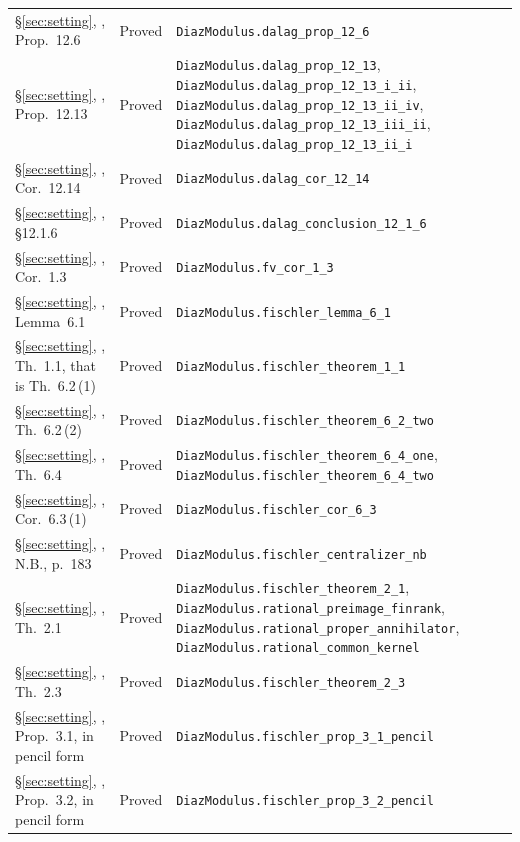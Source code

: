 \documentclass[11pt,a4paper]{article}
\theoremstyle{plain}
\theoremstyle{definition}
\begin{document}
\begin{center}
\begin{longtable}{@{}llp{6.2cm}@{}}
\S\ref{sec:setting}, \cite{waldschmidt-book}, Prop.~12.6 & Proved & \nolinkurl{DiazModulus.dalag_prop_12_6} \\
\S\ref{sec:setting}, \cite{waldschmidt-book}, Prop.~12.13 & Proved & \nolinkurl{DiazModulus.dalag_prop_12_13}, \nolinkurl{DiazModulus.dalag_prop_12_13_i_ii}, \nolinkurl{DiazModulus.dalag_prop_12_13_ii_iv}, \nolinkurl{DiazModulus.dalag_prop_12_13_iii_ii}, \nolinkurl{DiazModulus.dalag_prop_12_13_ii_i} \\
\S\ref{sec:setting}, \cite{waldschmidt-book}, Cor.~12.14 & Proved & \nolinkurl{DiazModulus.dalag_cor_12_14} \\
\S\ref{sec:setting}, \cite{waldschmidt-book}, \S12.1.6 & Proved & \nolinkurl{DiazModulus.dalag_conclusion_12_1_6} \\
\S\ref{sec:setting}, \cite{waldschmidt-2005b}, Cor.~1.3 & Proved & \nolinkurl{DiazModulus.fv_cor_1_3} \\
\S\ref{sec:setting}, \cite{fischler-2001}, Lemma~6.1 & Proved & \nolinkurl{DiazModulus.fischler_lemma_6_1} \\
\S\ref{sec:setting}, \cite{fischler-2001}, Th.~1.1, that is Th.~6.2\,(1) & Proved & \nolinkurl{DiazModulus.fischler_theorem_1_1} \\
\S\ref{sec:setting}, \cite{fischler-2001}, Th.~6.2\,(2) & Proved & \nolinkurl{DiazModulus.fischler_theorem_6_2_two} \\
\S\ref{sec:setting}, \cite{fischler-2001}, Th.~6.4 & Proved & \nolinkurl{DiazModulus.fischler_theorem_6_4_one}, \nolinkurl{DiazModulus.fischler_theorem_6_4_two} \\
\S\ref{sec:setting}, \cite{fischler-2001}, Cor.~6.3\,(1) & Proved & \nolinkurl{DiazModulus.fischler_cor_6_3} \\
\S\ref{sec:setting}, \cite{fischler-2001}, N.B., p.~183 & Proved & \nolinkurl{DiazModulus.fischler_centralizer_nb} \\
\S\ref{sec:setting}, \cite{fischler-2001}, Th.~2.1 & Proved & \nolinkurl{DiazModulus.fischler_theorem_2_1}, \nolinkurl{DiazModulus.rational_preimage_finrank}, \nolinkurl{DiazModulus.rational_proper_annihilator}, \nolinkurl{DiazModulus.rational_common_kernel} \\
\S\ref{sec:setting}, \cite{fischler-2001}, Th.~2.3 & Proved & \nolinkurl{DiazModulus.fischler_theorem_2_3} \\
\S\ref{sec:setting}, \cite{fischler-2001}, Prop.~3.1, in pencil form & Proved & \nolinkurl{DiazModulus.fischler_prop_3_1_pencil} \\
\S\ref{sec:setting}, \cite{fischler-2001}, Prop.~3.2, in pencil form & Proved & \nolinkurl{DiazModulus.fischler_prop_3_2_pencil} \\

\end{longtable}
\end{center}
\end{document}
